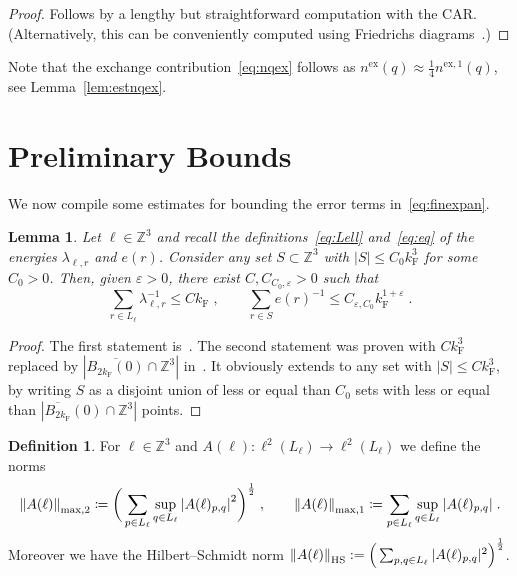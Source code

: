 \documentclass[12pt,a4paper]{article}
\numberwithin{equation}{section}
\newcommand{\1}{\mathbb{I}}
\newcommand{\ex}{\mathrm{ex}}
\newcommand{\F}{\mathrm{F}}
\newcommand{\HS}{\mathrm{HS}}
\newcommand{\Zstar}{\mathbb{Z}^3} %
\newcommand{\Z}{\mathbb{Z}}
\newcommand{\half}{\frac{1}{2}}
\theoremstyle{plain}
\newtheorem{lemma}[theorem]{Lemma}
\theoremstyle{definition}
\newtheorem{definition}[theorem]{Definition}
\theoremstyle{remark}
\theoremstyle{plain}
\theoremstyle{definition}
\theoremstyle{remark}
\begin{document}
\begin{proof}
Follows by a lengthy but straightforward computation with the CAR. (Alternatively, this can be conveniently computed using Friedrichs diagrams~\cite{BL23}.)
\end{proof}

Note that the exchange contribution~\eqref{eq:nqex} follows as $ n^{\ex}(q) \approx \frac 14 n^{\ex,1}(q) $, see Lemma~\ref{lem:estnqex}.




\section{Preliminary Bounds}
\label{sec:prelim_bounds}

We now compile some estimates for bounding the error terms in~\eqref{eq:finexpan}.

\begin{lemma} \label{lem:lambdainverse}
Let $ \ell \in \Zstar $ and recall the definitions~\eqref{eq:Lell} and~\eqref{eq:eq} of the energies $ \lambda_{\ell,r} $ and $ e(r) $. Consider any set $ S \subset \Z^3 $ with $ |S| \le C_0 k_{\F}^3 $ for some $ C_0 > 0 $. Then, given $ \varepsilon > 0 $, there exist $ C, C_{C_0, \varepsilon} > 0 $ such that
\begin{equation} \label{eq:lambdainverse}
	\sum_{r \in L_\ell} \lambda_{\ell,r}^{-1} \le C k_{\F} \;, \qquad
	\sum_{r \in S} e(r)^{-1} \le C_{\varepsilon, C_0} k_{\F}^{1+\varepsilon} \;.
\end{equation}
\end{lemma}
\begin{proof}
The first statement is~\cite[Prop.~A.2]{CHN21}. The second statement was proven with $ C k_{\F}^3 $ replaced by $ |\overline{B_{2 k_{\F}}(0)} \cap \Z^3| $ in~\cite[Lemma~3.2]{CHN24}. It obviously extends to any set with $ |S| \le C k_{\F}^3 $, by writing $ S $ as a disjoint union of less or equal than $ C_0 $ sets with less or equal than $ |\overline{B_{2 k_{\F}}}(0) \cap \Z^3| $ points.
\end{proof}

\begin{definition}
For $ \ell \in \Zstar$ and $A(\ell) : \ell^2(L_\ell) \to \ell^2(L_\ell)$ we define the norms
\begin{equation}
\begin{aligned}
	\norm{A(\ell)}_{\max,2}
	\coloneq \bigg(\sum_{p \in L_\ell}
	\sup\limits_{q \in L_\ell}
	\abs{A(\ell)_{p,q}}^2\bigg)^\half \;, \qquad
	\norm{A(\ell)}_{\mathrm{max,1}}
	\coloneq \sum_{p \in L_\ell}
	\sup\limits_{q \in L_\ell}
	\abs{A(\ell)_{p,q}} \;.
\end{aligned}
\end{equation}
Moreover we have the Hilbert--Schmidt norm $ \norm{A(\ell)}_{\HS} := \Big( \sum_{p,q \in L_\ell} |A(\ell)_{p,q}|^2 \Big)^{\half} $.
\end{definition}
\end{document}
